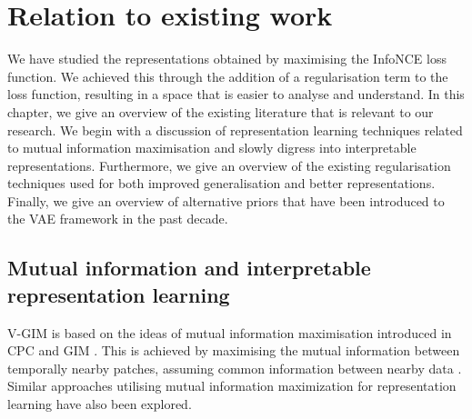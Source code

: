%
%
%

\chapter{Relation to existing work} \label{cha:5}

We have studied the representations obtained by maximising the InfoNCE loss function. We achieved this through the addition of a regularisation term to the loss function, resulting in a space that is easier to analyse and understand. In this chapter, we give an overview of the existing literature that is relevant to our research. We begin with a discussion of representation learning techniques related to mutual information maximisation and slowly digress into interpretable representations. Furthermore, we give an overview of the existing regularisation techniques used for both improved generalisation and better representations. Finally, we give an overview of alternative priors that have been introduced to the VAE framework in the past decade.


\section{Mutual information and interpretable representation learning}

	V-GIM is based on the ideas of mutual information maximisation introduced in CPC and GIM \citep{lowePuttingEndEndtoEnd2020, oordRepresentationLearningContrastive2019}. This is achieved by maximising the mutual information between temporally nearby patches, assuming common information between nearby data \citep{lowePuttingEndEndtoEnd2020}. Similar approaches utilising mutual information maximization for representation learning have also been explored.
	

